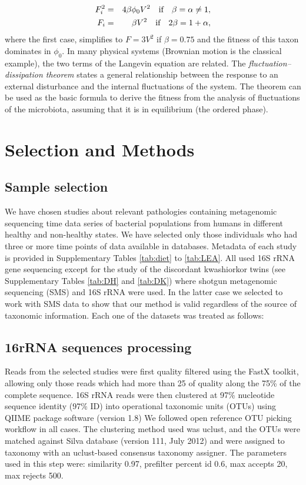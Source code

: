 \documentclass[12pt]{article}
\begin{document}
\begin{eqnarray}
F_i^2 &=& 4 \beta \phi_0 V^2\quad \textrm{if} \quad  \beta = \alpha \neq 1, \notag \\
F_i &=& \beta V^2\quad \textrm{if} \quad  2\beta = 1+\alpha,
\notag
\end{eqnarray}
where the first case, simplifies to $F= 3 V^2$ if $\beta = 0.75$ and the fitness of this taxon dominates in $\phi_0$. 
In many physical systems (Brownian motion is the classical example), the two terms of the Langevin equation are related.  The \emph{fluctuation--dissipation theorem} states a general relationship between the response to an external disturbance and the internal fluctuations of the system\cite{FD}. The theorem can be used as the basic formula to derive the fitness from the analysis of fluctuations 
of the microbiota, assuming that it is in equilibrium (the ordered phase).  

\section{Selection and Methods}

\subsection{Sample selection}
We have chosen studies about relevant pathologies containing metagenomic sequencing time data series of bacterial populations from humans in different healthy and non-healthy states. We have selected only those individuals who had three or more time points of data available in databases. Metadata of each study is provided in Supplementary Tables \ref{tab:diet} to \ref{tab:LEA}. All used 16S rRNA gene sequencing except for the study of the discordant kwashiorkor twins\cite{kwashiorkor} (see Supplementary Tables \ref{tab:DH} and \ref{tab:DK}) where shotgun metagenomic sequencing (SMS) and 16S rRNA were used. In the latter case we selected to work with SMS data to show that our method is valid regardless of the source of taxonomic information. Each one of the datasets was treated as follows:

\subsection{16rRNA sequences processing}
Reads from the selected studies were first quality filtered using the FastX toolkit\cite{FASTX}, allowing only those reads which had more than 25 of quality along the 75\% of the complete sequence. 16S rRNA reads were then clustered at 97\% nucleotide sequence identity (97\% ID) into operational taxonomic units (OTUs) using QIIME package software\cite{QIIME} (version 1.8) We followed open reference OTU picking workflow in all cases. The clustering method used was uclust, and the OTUs were matched against Silva database\cite{SILVA} (version 111, July 2012) and were assigned to taxonomy with an uclust-based consensus taxonomy assigner. The parameters used in this step were: similarity 0.97, prefilter percent id 0.6, max accepts 20, max rejects 500. 
\end{document}
